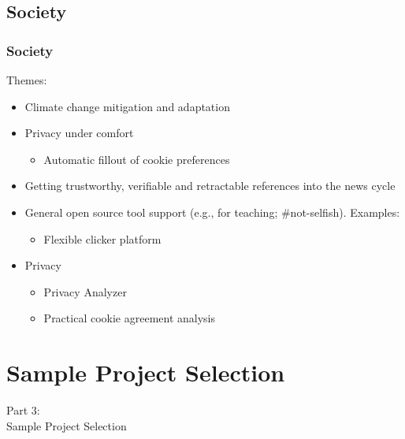 \subsection{Society}
\begin{frame}
    \frametitle{Society}
    \vspace{3mm}
    Themes:
    \begin{itemize}
        \item Climate change mitigation and adaptation
        \item Privacy under comfort
          \begin{itemize}
            \item Automatic fillout of cookie preferences
          \end{itemize}
        \item Getting trustworthy, verifiable and retractable references into the news cycle
        \item General open source tool support (e.g., for teaching; \#not-selfish). Examples:
          \begin{itemize}
            \item Flexible clicker platform
              \\
          \end{itemize}
        \item Privacy
          \begin{itemize}
            \item Privacy Analyzer
              \\
            \item Practical cookie agreement analysis
              \\
          \end{itemize}
    \end{itemize}
\end{frame}

\section{Sample Project Selection}
\begin{frame}
    \vspace{25mm}
    \begin{center}
        \Huge{Part 3:\\Sample Project Selection}
    \end{center}
\end{frame}

